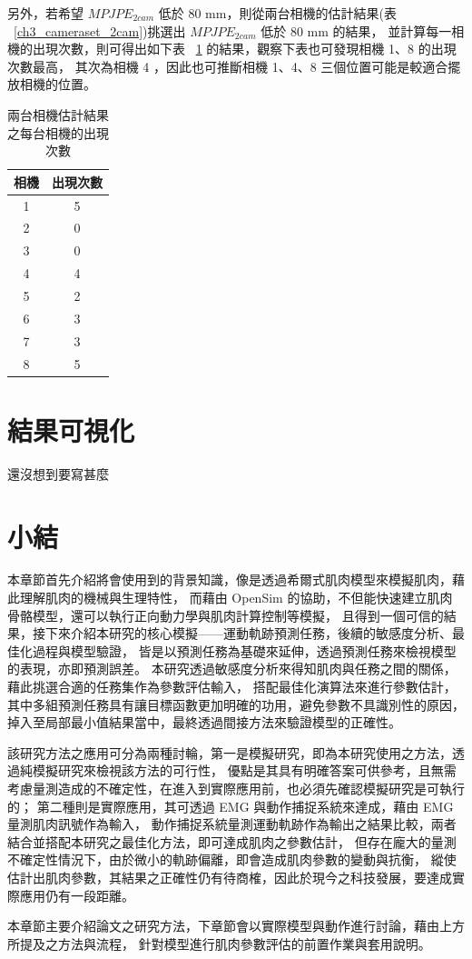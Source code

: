 另外，若希望 $MPJPE_{2 cam}$ 低於 80 mm，則從兩台相機的估計結果(表 ~\ref{ch3_cameraset_2cam})挑選出 $MPJPE_{2 cam}$ 低於 80 mm 的結果，
並計算每一相機的出現次數，則可得出如下表 ~\ref{ch3_cam_occurrence} 的結果，觀察下表也可發現相機 1、8 的出現次數最高，
其次為相機 4 ，因此也可推斷相機 1、4、8 三個位置可能是較適合擺放相機的位置。
\begin{table}[!ht]
   \caption[兩台相機估計結果之每台相機的出現次數]{兩台相機估計結果之每台相機的出現次數}
   \centering
   \label{ch3_cam_occurrence}
   \setlength{\tabcolsep}{3pt}
   \renewcommand\arraystretch{1.5}
   \begin{tabular}{c|c}
      相機 & 出現次數 \\
      \midrule[2pt]
      1 & 5 \\
      2 & 0 \\
      3 & 0 \\
      4 & 4 \\
      5 & 2 \\
      6 & 3 \\
      7 & 3 \\
      8 & 5 \\
   \end{tabular}
\end{table}

\section{結果可視化}
還沒想到要寫甚麼

\section{小結}
本章節首先介紹將會使用到的背景知識，像是透過希爾式肌肉模型來模擬肌肉，藉此理解肌肉的機械與生理特性，
而藉由 OpenSim 的協助，不但能快速建立肌肉骨骼模型，還可以執行正向動力學與肌肉計算控制等模擬，
且得到一個可信的結果，接下來介紹本研究的核心模擬——運動軌跡預測任務，後續的敏感度分析、最佳化過程與模型驗證，
皆是以預測任務為基礎來延伸，透過預測任務來檢視模型的表現，亦即預測誤差。
本研究透過敏感度分析來得知肌肉與任務之間的關係，藉此挑選合適的任務集作為參數評估輸入，
搭配最佳化演算法來進行參數估計，其中多組預測任務具有讓目標函數更加明確的功用，避免參數不具識別性的原因，
掉入至局部最小值結果當中，最終透過間接方法來驗證模型的正確性。

該研究方法之應用可分為兩種討輪，第一是模擬研究，即為本研究使用之方法，透過純模擬研究來檢視該方法的可行性，
優點是其具有明確答案可供參考，且無需考慮量測造成的不確定性，在進入到實際應用前，也必須先確認模擬研究是可執行的；
第二種則是實際應用，其可透過 EMG 與動作捕捉系統來達成，藉由 EMG 量測肌肉訊號作為輸入，
動作捕捉系統量測運動軌跡作為輸出之結果比較，兩者結合並搭配本研究之最佳化方法，即可達成肌肉之參數估計，
但存在龐大的量測不確定性情況下，由於微小的軌跡偏離，即會造成肌肉參數的變動與抗衡，
縱使估計出肌肉參數，其結果之正確性仍有待商榷，因此於現今之科技發展，要達成實際應用仍有一段距離。

本章節主要介紹論文之研究方法，下章節會以實際模型與動作進行討論，藉由上方所提及之方法與流程，
針對模型進行肌肉參數評估的前置作業與套用說明。

\clearpage